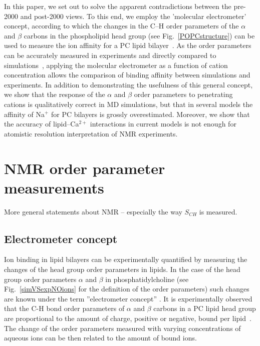 In this paper, we set out to solve the apparent contradictions
between the pre-2000 and post-2000 views.
To this end, we employ the 'molecular electrometer' concept,
according to which the changes in the C--H order parameters of the $\alpha$ and $\beta$ carbons 
in the phospholipid head group (see Fig.~\ref{POPCstructure}) can be used to measure the ion affinity for a
PC lipid bilayer~\cite{brown77,akutsu81,altenbach84,seelig87,scherer89}.
As the order parameters can be accurately measured in experiments and directly compared to 
simulations~\cite{ollila16}, applying the molecular electrometer as a function of cation concentration allows the 
comparison of binding affinity between simulations and experiments.
In addition to demonstrating the usefulness of this general concept,
we show that the response of the $\alpha$ and $\beta$ order parameters to penetrating cations
is qualitatively correct in MD simulations, but that in several  models the affinity of Na$^{+}$ for PC bilayers
is grossly overestimated.
Moreover, we show that the accuracy of lipid--Ca$^{2+}$ interactions 
in current models is not enough for atomistic resolution interpretation of NMR experiments. 


\section{NMR order parameter measurements}
 
  More general statements about NMR  -- especially the way $S_{CH}$ is measured. 


\subsection{Electrometer concept} \label{section:electrometer} 

Ion binding in lipid bilayers can be experimentally quantified
by measuring the changes of the head group order parameters in lipids.
In the case of the head group order parameters $\alpha$ and $\beta$ in phosphatidylcholine
(see Fig.~\ref{simVSexpNOions} for the definition of the order parameters)
such changes are known under the term ''electrometer concept'' \citet{seelig87,catte16}. 
It is experimentally observed that the C-H bond
order parameters of $\alpha$ and $\beta$ carbons in a PC lipid head group
are proportional to the amount of charge, positive or negative, bound per lipid~\citep{seelig87}.
The change of the order parameters measured with varying concentrations of aqueous ions 
can be then related to the amount of bound ions.

